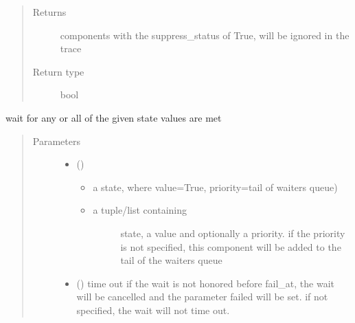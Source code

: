 \documentclass[letterpaper,10pt,english]{sphinxmanual}
\begin{document}
\begin{fulllineitems}
\begin{fulllineitems}
\begin{quote}
\begin{description}
\item[{Returns}] \leavevmode
{} \textendash{} components with the suppress\_status of True, will be ignored in the trace

\item[{Return type}] \leavevmode
bool

\end{description}\end{quote}

\end{fulllineitems}


\begin{fulllineitems}
\label{\detokenize{Reference:salabim.Component.wait}}
wait for any or all of the given state values are met
\begin{quote}\begin{description}
\item[{Parameters}] \leavevmode\begin{itemize}
\item {} 
 (\sphinxstyleliteralemphasis{\sphinxupquote{, }}) \textendash{} \begin{itemize}
\item {} 
a state, where value=True, priority=tail of waiters queue)

\item {} \begin{description}
\item[{a tuple/list containing }] \leavevmode
state, a value and optionally a priority. 
if the priority is not specified, this component will
be added to the tail of
the waiters queue 

\end{description}

\end{itemize}


\item {} 
 () \textendash{} time out 
if the wait is not honored before fail\_at,
the wait will be cancelled and the
parameter failed will be set. 
if not specified, the wait will not time out.


\end{itemize}
\end{description}
\end{quote}
\end{fulllineitems}
\end{fulllineitems}
\end{document}
